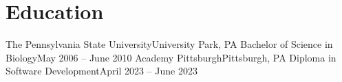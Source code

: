 
\section{Education}
\resumeSubHeadingListStart
  \resumeSubheading
    {The Pennsylvania State University}{University Park, PA}
    {Bachelor of Science in Biology}{May 2006 -- June 2010}
  \resumeSubheading
    {Academy Pittsburgh}{Pittsburgh, PA}
    {Diploma in Software Development}{April 2023 -- June 2023}
\resumeSubHeadingListEnd
